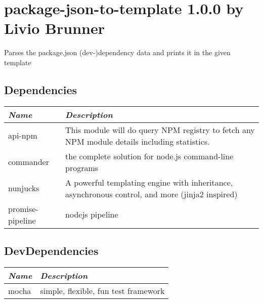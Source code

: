 \documentclass[12pt]{article}
\begin{document}
\section*{package-json-to-template 1.0.0 by Livio Brunner }

Parses the package.json (dev-)dependency data and prints it in the given template

\subsection*{Dependencies}

\begin{tabularx}{\textwidth}{p{} p{}}
    {\it Name} & {\it Description}\\
    \hline
    
    api-npm & This module will do query NPM registry to fetch any NPM module details including statistics.\\
    
    commander & the complete solution for node.js command-line programs\\
    
    nunjucks & A powerful templating engine with inheritance, asynchronous control, and more (jinja2 inspired)\\
    
    promise-pipeline & nodejs pipeline\\
     
\end{tabularx}

\subsection*{DevDependencies}

\begin{tabularx}{\textwidth}{p{} p{}}
    {\it Name} & {\it Description}\\
    \hline
    
    mocha & simple, flexible, fun test framework\\
     
\end{tabularx}


\newpage
\end{document}

